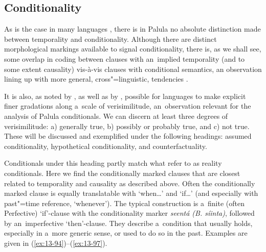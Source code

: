 \subsection{Conditionality}
\label{subsec:13-4-4}

As is the case in many languages \citep[257--258]{thompsonetal2007}, there is in Palula no absolute distinction made between temporality and conditionality. Although there are distinct morphological markings available to signal conditionality, there is, as we shall see, some overlap in coding between clauses with an~implied temporality (and to some extent causality) vis-à-vis clauses with conditional semantics, an observation lining up with more general, cross"=linguistic, tendencies \citep[161]{cristofaro2005}.



It is also, as noted by \citet[255--260]{thompsonetal2007}, as well as by \citet[333--334]{givon2001b}, possible for languages to make explicit finer gradations along a~scale of verisimilitude, an~observation relevant for the analysis of Palula conditionals. We can discern at least three degrees of verisimilitude: a) generally true, b) possibly or probably true, and c) not true. These will be discussed and exemplified under the following headings: assumed conditionality, hypothetical conditionality, and counterfactuality.



 Conditionals under this heading partly match what \citet[255--256]{thompsonetal2007} refer to as reality conditionals. Here we find the conditionally marked clauses that are closest related to temporality and causality as described above. Often the conditionally marked clause is equally translatable with `when{\ldots}' and `if{\ldots}' (and especially with past"=time reference, `whenever'). The typical construction is a~finite (often Perfective) `if'-clause with the conditionality marker \textit{seentá (B. síinta)}, followed by an~imperfective `then'-clause. They describe a~condition that usually holds, especially in a~more generic sense, or used to do so in the past. Examples are given in (\ref{ex:13-94})--(\ref{ex:13-97}).

